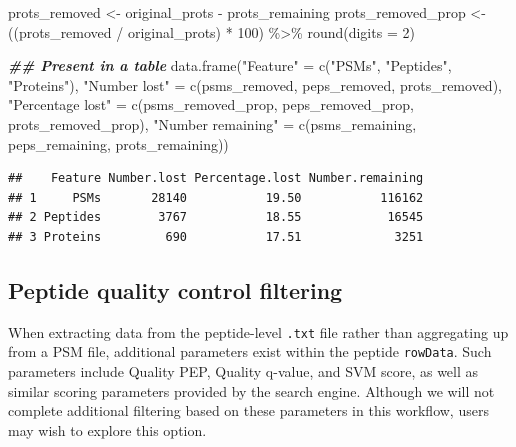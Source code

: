 \documentclass[9pt,a4paper,]{extarticle}
\newenvironment{Shaded}{\begin{snugshade}}{\end{snugshade}}
\newcommand{\AttributeTok}[1]{\textcolor[rgb]{0.77,0.63,0.00}{#1}}
\newcommand{\DecValTok}[1]{\textcolor[rgb]{0.00,0.00,0.81}{#1}}
\newcommand{\DocumentationTok}[1]{\textcolor[rgb]{0.56,0.35,0.01}{\textbf{\textit{#1}}}}
\newcommand{\FunctionTok}[1]{\textcolor[rgb]{0.00,0.00,0.00}{#1}}
\newcommand{\NormalTok}[1]{#1}
\newcommand{\OtherTok}[1]{\textcolor[rgb]{0.56,0.35,0.01}{#1}}
\newcommand{\SpecialCharTok}[1]{\textcolor[rgb]{0.00,0.00,0.00}{#1}}
\newcommand{\StringTok}[1]{\textcolor[rgb]{0.31,0.60,0.02}{#1}}
\begin{document}
\begin{Shaded}
\begin{Highlighting}[]
\NormalTok{prots\_removed }\OtherTok{\textless{}{-}}\NormalTok{ original\_prots }\SpecialCharTok{{-}}\NormalTok{ prots\_remaining}
\NormalTok{prots\_removed\_prop }\OtherTok{\textless{}{-}}\NormalTok{ ((prots\_removed }\SpecialCharTok{/}\NormalTok{ original\_prots) }\SpecialCharTok{*} \DecValTok{100}\NormalTok{) }\SpecialCharTok{\%\textgreater{}\%}
  \FunctionTok{round}\NormalTok{(}\AttributeTok{digits =} \DecValTok{2}\NormalTok{)}

\DocumentationTok{\#\# Present in a table}
\FunctionTok{data.frame}\NormalTok{(}\StringTok{"Feature"} \OtherTok{=} \FunctionTok{c}\NormalTok{(}\StringTok{"PSMs"}\NormalTok{,}
                         \StringTok{"Peptides"}\NormalTok{,}
                         \StringTok{"Proteins"}\NormalTok{),}
           \StringTok{"Number lost"} \OtherTok{=} \FunctionTok{c}\NormalTok{(psms\_removed,}
\NormalTok{                             peps\_removed,}
\NormalTok{                             prots\_removed),}
           \StringTok{"Percentage lost"} \OtherTok{=} \FunctionTok{c}\NormalTok{(psms\_removed\_prop,}
\NormalTok{                                 peps\_removed\_prop,}
\NormalTok{                                 prots\_removed\_prop),}
           \StringTok{"Number remaining"} \OtherTok{=} \FunctionTok{c}\NormalTok{(psms\_remaining,}
\NormalTok{                                  peps\_remaining,}
\NormalTok{                                  prots\_remaining))}
\end{Highlighting}
\end{Shaded}

\begin{verbatim}
##    Feature Number.lost Percentage.lost Number.remaining
## 1     PSMs       28140           19.50           116162
## 2 Peptides        3767           18.55            16545
## 3 Proteins         690           17.51             3251
\end{verbatim}

\hypertarget{peptide-quality-control-filtering}{%
\subsection{Peptide quality control filtering}\label{peptide-quality-control-filtering}}

When extracting data from the peptide-level \texttt{.txt} file rather than aggregating
up from a PSM file, additional parameters exist within the peptide \texttt{rowData}.
Such parameters include Quality PEP, Quality q-value, and SVM score, as well as
similar scoring parameters provided by the search engine. Although we will not
complete additional filtering based on these parameters in this workflow, users
may wish to explore this option.
\end{document}
